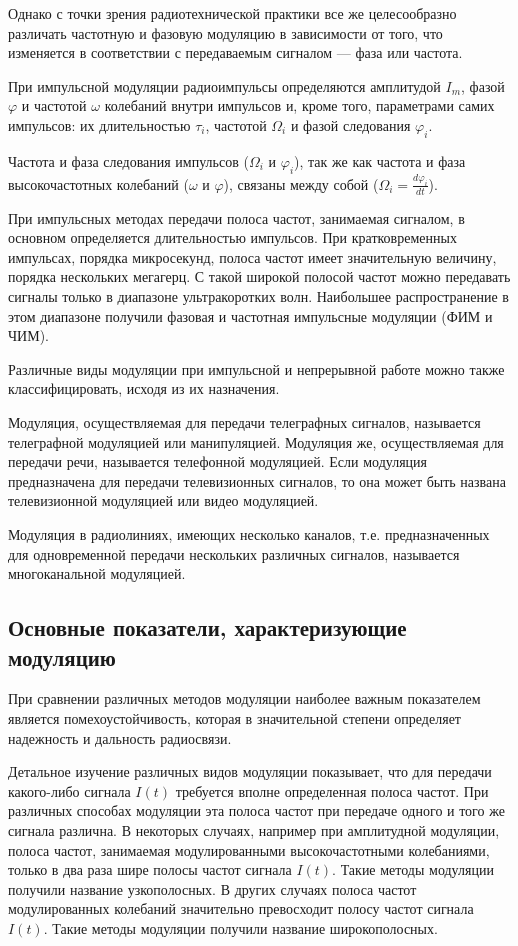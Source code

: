 Однако с точки зрения радиотехнической практики все же целесообразно различать частотную и фазовую модуляцию в зависимости от того, что изменяется в соответствии с передаваемым сигналом — фаза или частота. 

При импульсной модуляции радиоимпульсы определяются амплитудой $I_m$, фазой $\varphi$ и частотой $\omega$ колебаний внутри импульсов и, кроме того, параметрами самих импульсов: их длительностью $\tau_i$, частотой $\Omega_i$ и фазой следования $\varphi_i$.

Частота и фаза следования импульсов ($\Omega_i$ и $\varphi_i$), так же как частота и фаза высокочастотных колебаний ($\omega$ и $\varphi$), связаны между собой ($\Omega_i=\frac{d\varphi_i}{dt}$).

При импульсных методах передачи полоса частот, занимаемая сигналом, в основном определяется длительностью импульсов. При кратковременных импульсах, порядка микросекунд, полоса частот имеет значительную величину, порядка нескольких мегагерц. С такой широкой полосой частот можно передавать сигналы только в диапазоне ультракоротких волн. Наибольшее распространение в этом диапазоне получили фазовая и частотная импульсные модуляции (ФИМ и ЧИМ).

Различные виды модуляции при импульсной и непрерывной работе можно также классифицировать, исходя из их назначения. 

Модуляция, осуществляемая для передачи телеграфных сигналов, называется телеграфной модуляцией или манипуляцией. Модуляция же, осуществляемая для передачи речи, называется телефонной модуляцией. Если модуляция предназначена для передачи телевизионных сигналов, то она может быть названа телевизионной модуляцией или видео модуляцией.

Модуляция в радиолиниях, имеющих несколько каналов, т.е. предназначенных для одновременной передачи нескольких различных сигналов, называется многоканальной модуляцией. 

\subsection{Основные показатели, характеризующие модуляцию}

При сравнении различных методов модуляции наиболее важным показателем является помехоустойчивость, которая в значительной степени определяет надежность и дальность радиосвязи.

Детальное изучение различных видов модуляции показывает, что для передачи какого-либо сигнала $I(t)$ требуется вполне определенная полоса частот. При различных способах модуляции эта полоса частот при передаче одного и того же сигнала различна. В некоторых случаях, например при амплитудной модуляции, полоса частот, занимаемая модулированными высокочастотными колебаниями, только в два раза шире полосы частот сигнала $I(t)$. Такие методы модуляции получили название узкополосных. В других
случаях полоса частот модулированных колебаний значительно превосходит
полосу частот сигнала $I(t)$. Такие методы модуляции получили название
широкополосных. 


